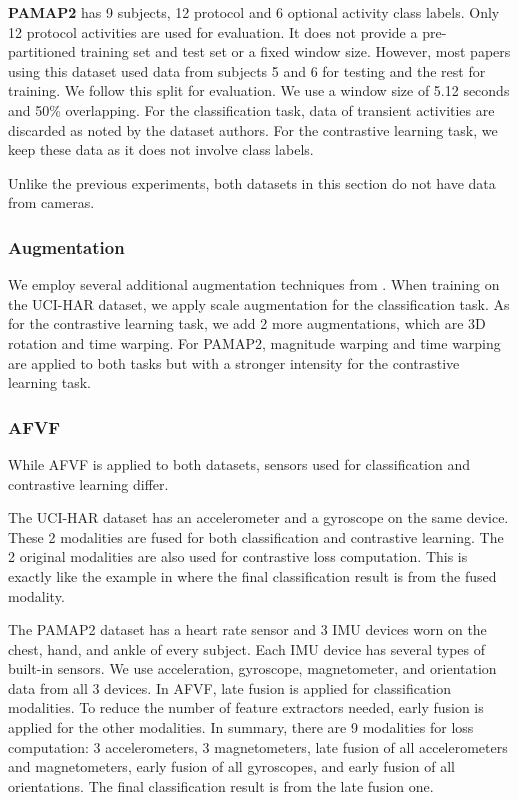 \documentclass[conference]{IEEEtran}
\begin{document}
\textbf{PAMAP2} \cite{Reiss2012} has 9 subjects, 12 protocol and 6 optional activity class labels. Only 12 protocol activities are used for evaluation. It does not provide a pre-partitioned training set and test set or a fixed window size. However, most papers using this dataset used data from subjects 5 and 6 for testing and the rest for training. We follow this split for evaluation. We use a window size of 5.12 seconds and 50\% overlapping. For the classification task, data of transient activities are discarded as noted by the dataset authors. For the contrastive learning task, we keep these data as it does not involve class labels.

Unlike the previous experiments, both datasets in this section do not have data from cameras.

\subsubsection{Augmentation}
We employ several additional augmentation techniques from \cite{Um2017}. When training on the UCI-HAR dataset, we apply scale augmentation for the classification task. As for the contrastive learning task, we add 2 more augmentations, which are 3D rotation and time warping. For PAMAP2, magnitude warping and time warping are applied to both tasks but with a stronger intensity for the contrastive learning task.

\subsubsection{AFVF}
While AFVF is applied to both datasets, sensors used for classification and contrastive learning differ.

The UCI-HAR dataset has an accelerometer and a gyroscope on the same device. These 2 modalities are fused for both classification and contrastive learning. The 2 original modalities are also used for contrastive loss computation. This is exactly like the example in  where the final classification result is from the fused modality.

The PAMAP2 dataset has a heart rate sensor and 3 IMU devices worn on the chest, hand, and ankle of every subject. Each IMU device has several types of built-in sensors. We use acceleration, gyroscope, magnetometer, and orientation data from all 3 devices. In AFVF, late fusion is applied for classification modalities. To reduce the number of feature extractors needed, early fusion is applied for the other modalities. In summary, there are 9 modalities for loss computation: 3 accelerometers, 3 magnetometers, late fusion of all accelerometers and magnetometers, early fusion of all gyroscopes, and early fusion of all orientations. The final classification result is from the late fusion one.
\end{document}
